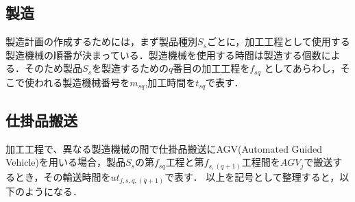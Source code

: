 \documentclass{jarticle}
\begin{document}
\subsection{製造}
製造計画の作成するためには，まず製品種別$S_s$ごとに，加工工程として使用する製造機械の順番が決まっている．製造機械を使用する時間は製造する個数による．そのため製品$S_{s}$を製造するための$q$番目の加工工程を$f_{sq}$ としてあらわし，そこで使われる製造機械番号を$m_{sq}$,加工時間を$t_{sq}$で表す．

\subsection{仕掛品搬送}
加工工程で、異なる製造機械の間で仕掛品搬送にAGV(Automated Guided Vehicle)を用いる場合，製品$S_s$の第$f_{sq}$工程と第$f_{s,(q+1)}$工程間を$AGV_{j}$で搬送するとき，その輸送時間を$ut_{j,s,q,(q+1)}$で表す．
以上を記号として整理すると，以下のようになる．
\end{document}
